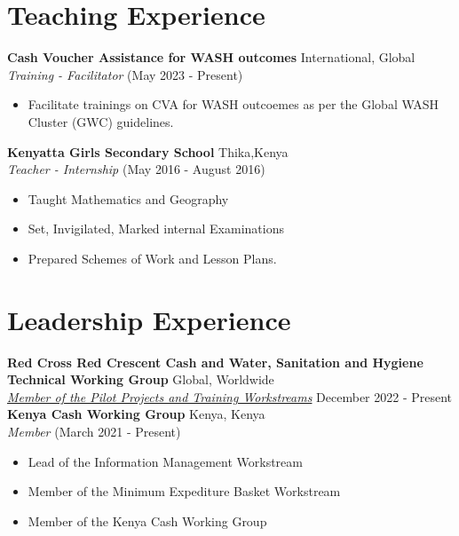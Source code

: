 \documentclass[line,margin,10pt]{res}
\begin{document}
\begin{resume}
\section{Teaching Experience}
\textbf{Cash Voucher Assistance for WASH outcomes} \hfill International, Global\\
{\sl Training - Facilitator} \hfill (May 2023 - Present)
\begin{itemize} \itemsep -2pt
    \item Facilitate trainings on CVA for WASH outcoemes as per the Global WASH Cluster (GWC) guidelines.
\end{itemize}

\textbf{Kenyatta Girls Secondary School} \hfill Thika,Kenya\\
{\sl Teacher - Internship} \hfill (May 2016 - August 2016)
\begin{itemize} \itemsep -2pt
    \item Taught Mathematics and Geography
    \item Set, Invigilated, Marked internal Examinations
    \item Prepared Schemes of Work and Lesson Plans.
\end{itemize}

{\vspace{-0.25cm}}

\section{Leadership Experience}
\textbf{Red Cross Red Crescent Cash and Water, Sanitation and Hygiene Technical Working Group} \hfill Global, Worldwide\\
{\sl \href{https://sites.google.com/view/twgcashandwash/about-twg/membership#h.2r4pyiwuqh4k}{Member of the Pilot Projects and Training Workstreams}} \hfill December 2022 - Present \\

\textbf{Kenya Cash Working Group} \hfill Kenya, Kenya\\
{\sl Member} \hfill (March 2021 - Present)
\begin{itemize} \itemsep -2pt
    \item Lead of the Information Management Workstream
    \item Member of the Minimum Expediture Basket Workstream
    \item Member of the Kenya Cash Working Group
\end{itemize}
{\vspace{-0.25cm}}


\end{resume}
\end{document}
